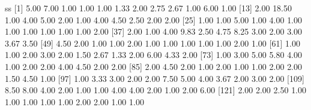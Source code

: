 \documentclass[
]{book}
\newenvironment{Shaded}{\begin{snugshade}}{\end{snugshade}}
\newcommand{\DecValTok}[1]{\textcolor[rgb]{0.00,0.00,0.81}{#1}}
\newcommand{\FloatTok}[1]{\textcolor[rgb]{0.00,0.00,0.81}{#1}}
\newcommand{\NormalTok}[1]{#1}
\begin{document}
\begin{Shaded}
\begin{Highlighting}[]
\NormalTok{ss}
\NormalTok{  [}\DecValTok{1}\NormalTok{]  }\FloatTok{5.00}  \FloatTok{7.00}  \FloatTok{1.00}  \FloatTok{1.00}  \FloatTok{1.00}  \FloatTok{1.33}  \FloatTok{2.00}  \FloatTok{2.75}  \FloatTok{2.67}  \FloatTok{1.00}  \FloatTok{6.00}  \FloatTok{1.00}
\NormalTok{ [}\DecValTok{13}\NormalTok{]  }\FloatTok{2.00} \FloatTok{18.50}  \FloatTok{1.00}  \FloatTok{4.00}  \FloatTok{5.00}  \FloatTok{2.00}  \FloatTok{1.00}  \FloatTok{4.00}  \FloatTok{4.50}  \FloatTok{2.50}  \FloatTok{2.00}  \FloatTok{2.00}
\NormalTok{ [}\DecValTok{25}\NormalTok{]  }\FloatTok{1.00}  \FloatTok{1.00}  \FloatTok{5.00}  \FloatTok{1.00}  \FloatTok{4.00}  \FloatTok{1.00}  \FloatTok{1.00}  \FloatTok{1.00}  \FloatTok{1.00}  \FloatTok{1.00}  \FloatTok{1.00}  \FloatTok{2.00}
\NormalTok{ [}\DecValTok{37}\NormalTok{]  }\FloatTok{2.00}  \FloatTok{1.00}  \FloatTok{4.00}  \FloatTok{9.83}  \FloatTok{2.50}  \FloatTok{4.75}  \FloatTok{8.25}  \FloatTok{3.00}  \FloatTok{2.00}  \FloatTok{3.00}  \FloatTok{3.67}  \FloatTok{3.50}
\NormalTok{ [}\DecValTok{49}\NormalTok{]  }\FloatTok{4.50}  \FloatTok{2.00}  \FloatTok{1.00}  \FloatTok{1.00}  \FloatTok{2.00}  \FloatTok{1.00}  \FloatTok{1.00}  \FloatTok{1.00}  \FloatTok{1.00}  \FloatTok{1.00}  \FloatTok{2.00}  \FloatTok{1.00}
\NormalTok{ [}\DecValTok{61}\NormalTok{]  }\FloatTok{1.00}  \FloatTok{1.00}  \FloatTok{2.00}  \FloatTok{3.00}  \FloatTok{2.00}  \FloatTok{1.50}  \FloatTok{2.67}  \FloatTok{1.33}  \FloatTok{2.00}  \FloatTok{6.00}  \FloatTok{4.33}  \FloatTok{2.00}
\NormalTok{ [}\DecValTok{73}\NormalTok{]  }\FloatTok{1.00}  \FloatTok{3.00}  \FloatTok{5.00}  \FloatTok{5.80}  \FloatTok{4.00}  \FloatTok{1.00}  \FloatTok{2.00}  \FloatTok{2.00}  \FloatTok{4.00}  \FloatTok{4.50}  \FloatTok{2.00}  \FloatTok{2.00}
\NormalTok{ [}\DecValTok{85}\NormalTok{]  }\FloatTok{2.00}  \FloatTok{4.50}  \FloatTok{2.00}  \FloatTok{1.00}  \FloatTok{2.00}  \FloatTok{1.00}  \FloatTok{1.00}  \FloatTok{2.00}  \FloatTok{2.00}  \FloatTok{1.50}  \FloatTok{4.50}  \FloatTok{1.00}
\NormalTok{ [}\DecValTok{97}\NormalTok{]  }\FloatTok{1.00}  \FloatTok{3.33}  \FloatTok{3.00}  \FloatTok{2.00}  \FloatTok{2.00}  \FloatTok{7.50}  \FloatTok{5.00}  \FloatTok{4.00}  \FloatTok{3.67}  \FloatTok{2.00}  \FloatTok{3.00}  \FloatTok{2.00}
\NormalTok{[}\DecValTok{109}\NormalTok{]  }\FloatTok{8.50}  \FloatTok{8.00}  \FloatTok{4.00}  \FloatTok{2.00}  \FloatTok{1.00}  \FloatTok{1.00}  \FloatTok{4.00}  \FloatTok{4.00}  \FloatTok{2.00}  \FloatTok{1.00}  \FloatTok{2.00}  \FloatTok{6.00}
\NormalTok{[}\DecValTok{121}\NormalTok{]  }\FloatTok{2.00}  \FloatTok{2.00}  \FloatTok{2.50}  \FloatTok{1.00}  \FloatTok{1.00}  \FloatTok{1.00}  \FloatTok{1.00}  \FloatTok{1.00}  \FloatTok{2.00}  \FloatTok{2.00}  \FloatTok{1.00}  \FloatTok{1.00}

\end{Highlighting}
\end{Shaded}
\end{document}
